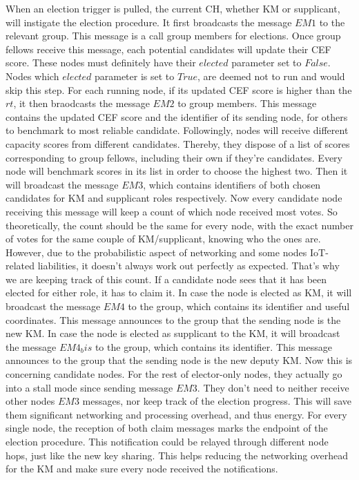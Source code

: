 When an election trigger is pulled, the current CH, whether KM or supplicant, will instigate the election procedure. It first broadcasts the message $EM1$ to the relevant group. This message is a call group members for elections. Once group fellows receive this message, each potential candidates will update their CEF score. These nodes must definitely have their $elected$ parameter set to $False$. Nodes which $elected$ parameter is set to $True$, are deemed not to run and would skip this step. For each running node, if its updated CEF score is higher than the $rt$, it then braodcasts the message $EM2$ to group members. This message contains the updated CEF score and the identifier of its sending node, for others to benchmark to most reliable candidate. Followingly, nodes will receive different capacity scores from different candidates. Thereby, they dispose of a list of scores corresponding to group fellows, including their own if they’re candidates. Every node will benchmark scores in its list in order to choose the highest two. Then it will broadcast the message $EM3$, which contains identifiers of both chosen candidates for KM and supplicant roles respectively. Now every candidate node receiving this message will keep a count of which node received most votes. So theoretically, the count should be the same for every node, with the exact number of votes for the same couple of KM/supplicant, knowing who the ones are. However, due to the probabilistic aspect of networking and some nodes IoT-related liabilities, it doesn’t always work out perfectly as expected. That’s why we are keeping track of this count. If a candidate node sees that it has been elected for either role, it has to claim it. In case the node is elected as KM, it will broadcast the message $EM4$ to the group, which contains its identifier and useful coordinates. This message announces to the group that the sending node is the new KM. In case the node is elected as supplicant to the KM, it will broadcast the message $EM4_bis$ to the group, which contains its identifier. This message announces to the group that the sending node is the new deputy KM. Now this is concerning candidate nodes. For the rest of elector-only nodes, they actually go into a stall mode since sending message $EM3$. They don’t need to neither receive other nodes $EM3$ messages, nor keep track of the election progress. This will save them significant networking and processing overhead, and thus energy. For every single node, the reception of both claim messages marks the endpoint of the election procedure. This notification could be relayed through different node hops, just like the new key sharing. This helps reducing the networking overhead for the KM and make sure every node received the notifications.

